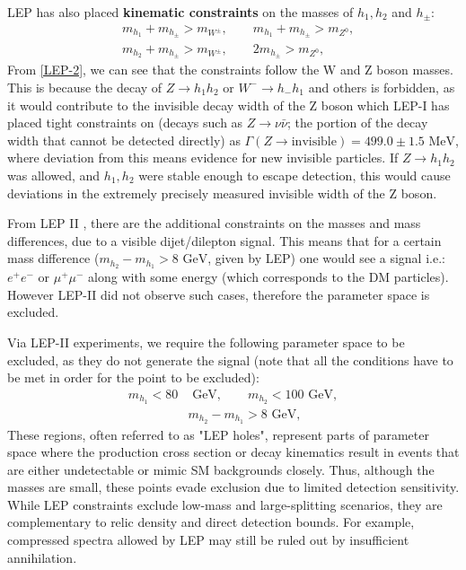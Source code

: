 \documentclass[12pt]{article}
\begin{document}
LEP has also placed \textbf{kinematic constraints} on the masses of $h_1, h_2$ and  $h_\pm$:
\begin{equation}
    \begin{split}
        &m_{h_1} + m_{h_\pm} > m_{W^\pm}, \qquad m_{h_1} + m_{h_\pm} > m_{Z^0},
        \\&m_{h_2} + m_{h_\pm} > m_{W^\pm}, \qquad 2m_{h_\pm} > m_{Z^0}, 
    \end{split}
\label{LEP-2}
\end{equation}
From \ref{LEP-2}, we can see that the constraints follow the W and Z boson masses. This is because the decay of $Z \rightarrow h_1h_2$ or $W^- \rightarrow h_-h_1$ and others is forbidden, as it would contribute to the invisible decay width of the Z boson which LEP-I has placed tight constraints on (decays such as $Z\rightarrow \nu \bar{\nu}$; the portion of the decay width that cannot be detected directly) as $\Gamma(Z\rightarrow \text{invisible}) = 499.0 \pm 1.5 \text{ MeV}$, where deviation from this means evidence for new invisible particles. If $Z \rightarrow h_1h_2$ was allowed, and $ h_1,h_2$ were stable enough to escape detection, this would cause deviations in the extremely precisely measured invisible width of the Z boson.

From LEP II \cite{Lundstr_m_2009}, there are the additional constraints on the masses and mass differences, due to a visible dijet/dilepton signal. This means that for a certain mass difference ($m_{h_2} - m_{h_1} > 8\text{ GeV}$, given by LEP) one would see a signal i.e.: $e^+e^-$ or $\mu^+ \mu^-$ along with some energy (which corresponds to the DM particles). However LEP-II did not observe such cases, therefore the parameter space is excluded. 

Via LEP-II experiments, we require the following parameter space to be excluded, as they do not generate the signal (note that all the conditions have to be met in order for the point to be excluded):
\begin{equation}
    \begin{split}
        m_{h_1} < 80 &\text{ GeV}, \qquad
        m_{h_2} < 100 \text{ GeV},
        \\
        &m_{h_2} - m_{h_1} > 8\text{ GeV},
    \end{split}
\label{LEP-3}
\end{equation}
These regions, often referred to as "LEP holes", represent parts of parameter space where the production cross section or decay kinematics result in events that are either undetectable or mimic SM backgrounds closely. Thus, although the masses are small, these points evade exclusion due to limited detection sensitivity. While LEP constraints exclude low-mass and large-splitting scenarios, they are complementary to relic density and direct detection bounds. For example, compressed spectra allowed by LEP may still be ruled out by insufficient annihilation.
\end{document}
